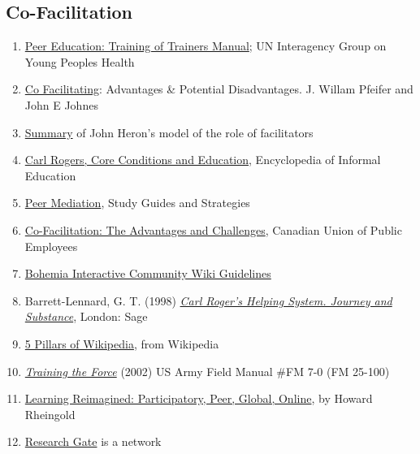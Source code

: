 \subsection{Co-Facilitation}

\begin{enumerate}
\item
  \href{http://www.scribd.com/doc/54544925/51/TRAINING-TOPIC-Co-facilitation-skills}{Peer
  Education: Training of Trainers Manual}; UN Interagency Group on Young
  Peoples Health
\item
  \href{http://www.breakoutofthebox.com/Co-FacilitatingPfeifferJones.pdf}{Co
  Facilitating}: Advantages \& Potential Disadvantages. J. Willam
  Pfeifer and John E Johnes
\item
  \href{http://reviewing.co.uk/archives/art/13\_1\_what\_do\_facilitators\_do.htm\#8\_WAYS\_OF\_FACILITATING\_ACTIVE\_LEARNING}{Summary}
  of John Heron's model of the role of facilitators
\item
  \href{http://www.infed.org/thinkers/et-rogers.htm}{Carl
  Rogers, Core Conditions and Education}, Encyclopedia of Informal
  Education
\item
  \href{http://www.studygs.net/peermed.htm}{Peer Mediation}, Study
  Guides and Strategies
\item
  \href{http://sk.cupe.ca/updir/cofacilitation-handouts.doc}{Co-Facilitation:
  The Advantages and Challenges}, Canadian Union of Public Employees
\item
  \href{http://community.bistudio.com/wiki/Bohemia\_Interactive\_Community:Guidelines}{Bohemia
  Interactive Community Wiki Guidelines}
\item
  Barrett-Lennard, G. T. (1998)
  \emph{\href{http://openlibrary.org/works/OL2014352W/Carl\_Rogers'\_Helping\_System}{Carl
  Roger's Helping System. Journey and Substance}}, London: Sage
\item
  \href{http://en.wikipedia.org/w/index.php?title=Wikipedia:Five\_pillars\&oldid=501472166}{5
  Pillars of Wikipedia}, from Wikipedia
\item
  \emph{\href{http://www.africom.mil/WO-NCO/DownloadCenter/\%5C40Publications/Training\%20the\%20Force\%20Manual.pdf}{Training
  the Force}} (2002) US Army Field Manual \#FM 7-0 (FM 25-100)
\item
  \href{http://dmlcentral.net/blog/howard-rheingold/learning-reimagined-participatory-peer-global-online}{Learning
  Reimagined: Participatory, Peer, Global, Online}, by Howard Rheingold
\item
  \href{http://www.researchgate.net/}{Research Gate} is a network

\end{enumerate}

